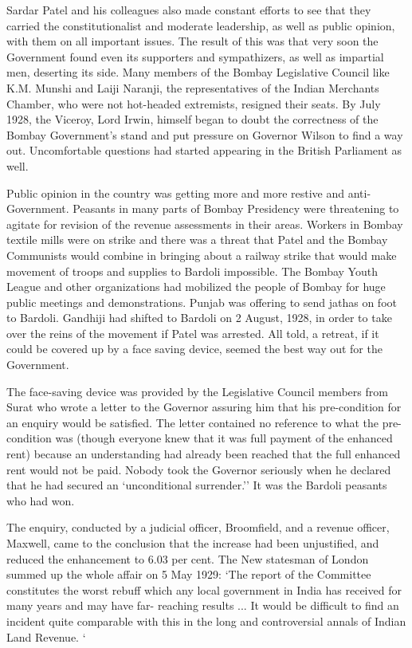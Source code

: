 \begin{multicols}{2}
Sardar Patel and his colleagues also made constant efforts to see that they carried the constitutionalist and moderate leadership, as well as public opinion, with them on all important issues. The result of this was that very soon the Government found even its supporters and sympathizers, as well as impartial men, deserting its side. Many members of the Bombay Legislative Council like K.M. Munshi and Laiji Naranji, the representatives of the Indian Merchants Chamber, who were not hot-headed extremists, resigned their seats. By July 1928, the Viceroy, Lord Irwin, himself began to doubt the correctness of the Bombay Government's stand and put pressure on Governor Wilson to find a way out. Uncomfortable questions had started appearing in the British Parliament as well.

Public opinion in the country was getting more and more restive and anti-Government. Peasants in many parts of Bombay Presidency were threatening to agitate for revision of the revenue assessments in their areas. Workers in Bombay textile mills were on strike and there was a threat that Patel and the Bombay Communists would combine in bringing about a railway strike that would make movement of troops and supplies to Bardoli impossible. The Bombay Youth League and other organizations had mobilized the people of Bombay for huge public meetings and demonstrations. Punjab was offering to send jathas on foot to Bardoli. Gandhiji had shifted to Bardoli on 2 August, 1928, in order to take over the reins of the movement if Patel was arrested. All told, a retreat, if it could be covered up by a face saving device, seemed the best way out for the Government.

The face-saving device was provided by the Legislative Council members from Surat who wrote a letter to the Governor assuring him that his pre-condition for an enquiry would be satisfied. The letter contained no reference to what the pre-condition was (though everyone knew that it was full payment of the enhanced rent) because an understanding had already been reached that the full enhanced rent would not be paid. Nobody took the Governor seriously when he declared that he had secured an `unconditional surrender.'' It was the Bardoli peasants who had won.

The enquiry, conducted by a judicial officer, Broomfield, and a revenue officer, Maxwell, came to the conclusion that the increase had been unjustified, and reduced the enhancement to 6.03 per cent. The New statesman of London summed up the whole affair on 5 May 1929: `The report of the Committee constitutes the worst rebuff which any local government in India has received for many years and may have far- reaching results ... It would be difficult to find an incident quite comparable with this in the long and controversial annals of Indian Land Revenue. `


\end{multicols}
